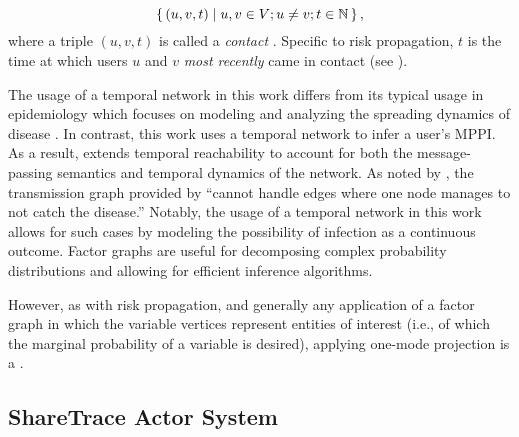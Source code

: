 \begin{equation}
    \set{ (u, v, t) | u, v \in V; u \neq v; t \in \mathbb{N}}, \label{eq:contact-seq}
\end{equation}
%
where a triple $(u, v, t)$ is called a \emph{contact} \citep{Holme2012}. Specific to risk propagation, $t$ is the time at which users $u$ and $v$ \emph{most recently} came in contact (see ).

The usage of a temporal network in this work differs from its typical usage in epidemiology which focuses on modeling and analyzing the spreading dynamics of disease \citep{Riolo2001, Danon2011, Lokhov2014, Craft2015, Pastor-Satorras2015, Koher2019, Zino2021}. In contrast, this work uses a temporal network to infer a user's MPPI. As a result,  extends temporal reachability to account for both the message-passing semantics and temporal dynamics of the network. As noted by \citet{Holme2012}, the transmission graph provided by \citet{Riolo2001} ``cannot handle edges where one node manages to not catch the disease.'' Notably, the usage of a temporal network in this work allows for such cases by modeling the possibility of infection as a continuous outcome.
Factor graphs are useful for decomposing complex probability distributions and allowing for efficient inference algorithms.

However, as with risk propagation, and generally any application of a factor graph in which the variable vertices represent entities of interest (i.e., of which the marginal probability of a variable is desired), applying one-mode projection is a .

\subsection{ShareTrace Actor System}

